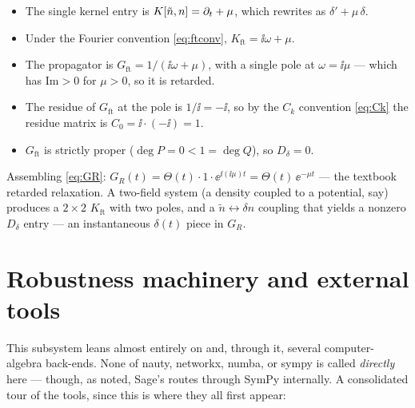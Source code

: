 \begin{itemize}
  \item The single kernel entry is $K[\tilde n, n] = \partial_t + \mu$, which
         rewrites as $\delta' + \mu\,\delta$.
  \item Under the Fourier convention \eqref{eq:ftconv}, $K_{\mathrm{ft}} = \ii\omega
        + \mu$.
  \item The propagator is $G_{\mathrm{ft}} = 1/(\ii\omega + \mu)$, with a single
        pole at $\omega = \ii\mu$ --- which has $\mathrm{Im} > 0$ for $\mu > 0$, so
        it is retarded.
  \item The residue of $G_{\mathrm{ft}}$ at the pole is $1/\ii = -\ii$, so by the
        $C_k$ convention \eqref{eq:Ck} the residue matrix is $C_0 = \ii\cdot(-\ii)
        = 1$.
  \item $G_{\mathrm{ft}}$ is strictly proper ($\deg P = 0 < 1 = \deg Q$), so
        $D_\delta = 0$.
\end{itemize}

Assembling \eqref{eq:GR}: $G_R(t) = \Theta(t)\cdot 1\cdot\ee^{\ii(\ii\mu)t} =
\Theta(t)\,\ee^{-\mu t}$ --- the textbook retarded relaxation. A two-field system
(a density coupled to a potential, say) produces a $2\times2$ $K_{\mathrm{ft}}$
with two poles, and a $\tilde n \leftrightarrow \delta n$ coupling that yields a
nonzero $D_\delta$ entry --- an instantaneous $\delta(t)$ piece in $G_R$.

\section{Robustness machinery and external tools}

This subsystem leans almost entirely on  and, through it, several
computer-algebra back-ends. None of nauty, networkx, numba, or sympy is called
\emph{directly} here --- though, as noted, Sage's  routes
through SymPy internally. A consolidated tour of the tools, since this is where
they all first appear:

